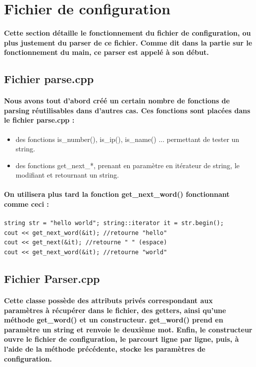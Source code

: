 \documentclass[a4paper]{article}
\begin{document}
\section{Fichier de configuration} \paragraph{Cette section détaille le
fonctionnement du fichier de configuration, ou plus justement du parser de ce
fichier. Comme dit dans la partie sur le fonctionnement du main, ce parser est
appelé à son début.}

\subsection{Fichier parse.cpp} \paragraph{Nous avons tout d’abord créé un
certain nombre de fonctions de parsing réutilisables dans d’autres cas. Ces
fonctions sont placées dans le fichier parse.cpp :}

\begin{itemize} \item des fonctions is\_number(), is\_ip(), is\_name() ...
permettant de tester un string. \item des fonctions get\_next\_*, prenant en
paramètre en itérateur de string, le modifiant et retournant un string.
\end{itemize}

\paragraph{On utilisera plus tard la fonction get\_next\_word() fonctionnant
comme ceci :}

\begin{verbatim}
string str = "hello world"; string::iterator it = str.begin();
cout << get_next_word(&it); //retourne "hello"
cout << get_next(&it); //retourne " " (espace)
cout << get_next_word(&it); //retourne "world"
\end{verbatim}

\subsection{Fichier Parser.cpp} \paragraph{Cette classe possède des attributs
privés correspondant aux paramètres à récupérer dans le fichier, des getters,
ainsi qu’une méthode get\_word() et un constructeur. get\_word() prend en
paramètre un string et renvoie le deuxième mot. Enfin, le constructeur ouvre le
fichier de configuration, le parcourt ligne par ligne, puis, à l’aide de la
méthode précédente, stocke les paramètres de configuration.}
\end{document}
